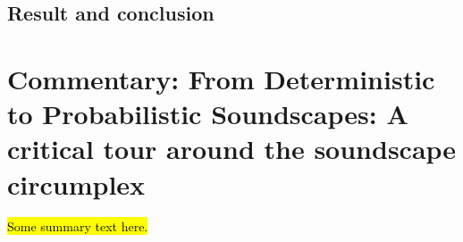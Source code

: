 \documentclass[oneside,fontsize=13pt,titlepage]{scrbook}
\begin{document}
\section*{Result and conclusion}

 

 \chapter[Commentary: Probabilistic Soundscapes]{Commentary: From Deterministic to Probabilistic Soundscapes: A critical tour around the soundscape circumplex}

 \hl{Some summary text here.}

 





 




 \backmatter
 \printglossaries

 

\end{document}
